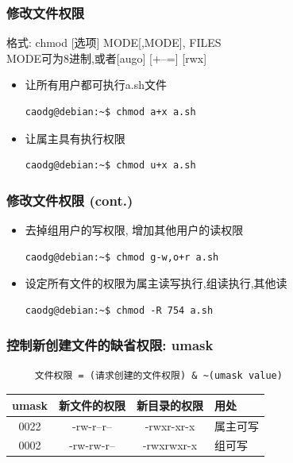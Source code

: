 \documentclass[compress]{beamer}
\begin{document}
\begin{frame}[containsverbatim]
\frametitle{修改文件权限}

格式: \alert{chmod} [选项] MODE[,MODE], FILES \\
MODE可为8进制,或者[augo] [+--=] [rwx]

\begin{itemize}
\item 让所有用户都可执行a.sh文件\\
\begin{Verbatim}
caodg@debian:~$ chmod a+x a.sh
\end{Verbatim}

\item 让属主具有执行权限\\
\begin{Verbatim}
caodg@debian:~$ chmod u+x a.sh
\end{Verbatim}

\end{itemize}


\end{frame}

\begin{frame}[containsverbatim]
\frametitle{修改文件权限 (cont.)}

\begin{itemize}
\item 去掉组用户的写权限, 增加其他用户的读权限\\
\begin{Verbatim}
caodg@debian:~$ chmod g-w,o+r a.sh
\end{Verbatim}

\item 设定所有文件的权限为属主读写执行,组读执行,其他读\\
\begin{Verbatim}
caodg@debian:~$ chmod -R 754 a.sh
\end{Verbatim}

\end{itemize}
\end{frame}

\begin{frame}[containsverbatim]
    \frametitle{控制新创建文件的缺省权限: umask}
\begin{verbatim}    
     文件权限 = (请求创建的文件权限) & ~(umask value)
 \end{verbatim}

 \begin{tabular}{ c | c | c | l}
     \hline
     umask & 新文件的权限 & 新目录的权限 & 用处 \\
     \hline \hline
     0022 &  -rw-r--r--  & -rwxr-xr-x  & 属主可写 \\
     0002 &  -rw-rw-r--  & -rwxrwxr-x  & 组可写  \\
     \hline
 \end{tabular}
\end{frame}
\end{document}
